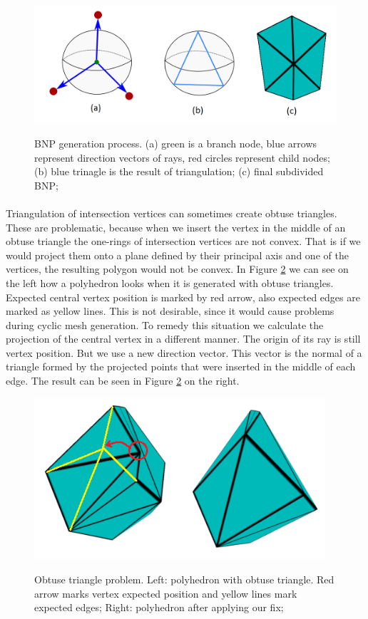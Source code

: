 \begin{figure}[h]
    \centering
    \includegraphics[width=\textwidth]{images/bnp_gen_ilu.png}
    \label{fig:bnp_gen_ilu}
    \caption[BNP generation process]{BNP generation process. (a) green is a branch node, blue arrows represent direction vectors of rays, red circles represent child nodes; (b) blue trinagle is the result of triangulation; (c) final subdivided BNP;}
\end{figure}

\paragraph{}
Triangulation of intersection vertices can sometimes create obtuse triangles. These are problematic, because when we insert the vertex in the middle of an obtuse triangle the one-rings of intersection vertices are not convex. That is if we would project them onto a plane defined by their principal axis and one of the vertices, the resulting polygon would not be convex. In Figure \ref{fig:obtus_tri_ilu} we can see on the left how a polyhedron looks when it is generated with obtuse triangles. Expected central vertex position is marked by red arrow, also expected edges are marked as yellow lines. This is not desirable, since it would cause problems during cyclic mesh generation. To remedy this situation we calculate the projection of the central vertex in a different manner. The origin of its ray is still vertex position. But we use a new direction vector. This vector is the normal of a triangle formed by the projected points that were inserted in the middle of each edge. The result can be seen in Figure \ref{fig:obtus_tri_ilu} on the right.

\begin{figure}[h]
    \centering
    \includegraphics[height=6cm]{images/obtuse_triangle_fix_ilu.png}
    \label{fig:obtus_tri_ilu}
    \caption[Obtuse triangle problem]{Obtuse triangle problem. Left: polyhedron with obtuse triangle. Red arrow marks vertex expected position and yellow lines mark expected edges; Right: polyhedron after applying our fix;}
\end{figure}